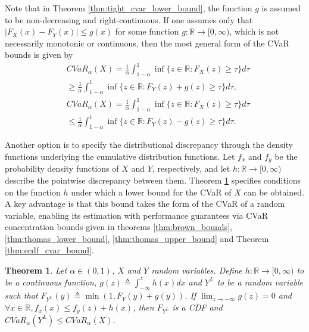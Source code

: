 \documentclass[letterpaper]{article} %
\newtheorem{theorem}{Theorem}[section]
\begin{document}
Note that in Theorem \ref{thm:tight_cvar_lower_bound}, the function $g$ is assumed to be non-decreasing and right-continuous. If one assumes only that $|F_X(x) - F_Y(x)| \leq g(x)$ for some function $g : \mathbb{R} \to [0, \infty)$, which is not necessarily monotonic or continuous, then the most general form of the CVaR bounds is given by
\begin{equation}\label{eq:general_g_cvar_lower_bound}
	\begin{aligned}
		&CVaR_\alpha(X)=\frac{1}{\alpha}\int_{1-\alpha}^1 \inf\{z\in \mathbb{R}:F_X(z)\geq \tau\}d\tau \\
		&\geq \frac{1}{\alpha}\int_{1-\alpha}^1 \inf\{z\in \mathbb{R}:F_Y(z)+g(z)\geq \tau\}d\tau,
	\end{aligned}
\end{equation}
\begin{equation}\label{eq:general_g_cvar_upper_bound}
	\begin{aligned}
		&CVaR_\alpha(X)=\frac{1}{\alpha}\int_{1-\alpha}^1 \inf\{z\in \mathbb{R}:F_X(z)\geq \tau\}d\tau \\
		&\leq \frac{1}{\alpha}\int_{1-\alpha}^1 \inf\{z\in \mathbb{R}:F_Y(z)-g(z)\geq \tau\}d\tau.
	\end{aligned}
\end{equation}

Another option is to specify the distributional discrepancy through the density functions underlying the cumulative distribution functions. Let $f_x$ and $f_y$ be the probability density functions of $X$ and $Y$, respectively, and let $h : \mathbb{R} \to [0, \infty)$ describe the pointwise discrepancy between them. Theorem \ref{thm:lower_cvar_bound_using_density_bound} specifies conditions on the function $h$ under which a lower bound for the CVaR of $X$ can be obtained. A key advantage is that this bound takes the form of the CVaR of a random variable, enabling its estimation with performance guarantees via CVaR concentration bounds given in  theorems \ref{thm:brown_bounds}, \ref{thm:thomas_lower_bound}, \ref{thm:thomas_upper_bound} and Theorem \ref{thm:ecdf_cvar_bound}.

\begin{theorem}\label{thm:lower_cvar_bound_using_density_bound}
	Let $\alpha \in (0,1)$, $X$ and $Y$ random variables. Define $h:\mathbb{R}\rightarrow [0,\infty)$ to be a continuous function, $g(z)\triangleq\int_{-\infty}^z h(x)dx$ and $Y^L$ to be a random variable such that $F_{Y^L}(y)\triangleq\min(1, F_{Y}(y) + g(y))$. If $\lim_{z\rightarrow -\infty} g(z)=0$ and $\forall x\in \mathbb{R},f_x(x)\leq f_y(z) + h(x)$, then $F_{Y^L}$ is a CDF and $CVaR_\alpha(Y^L)\leq CVaR_\alpha(X)$.
\end{theorem}
\end{document}
